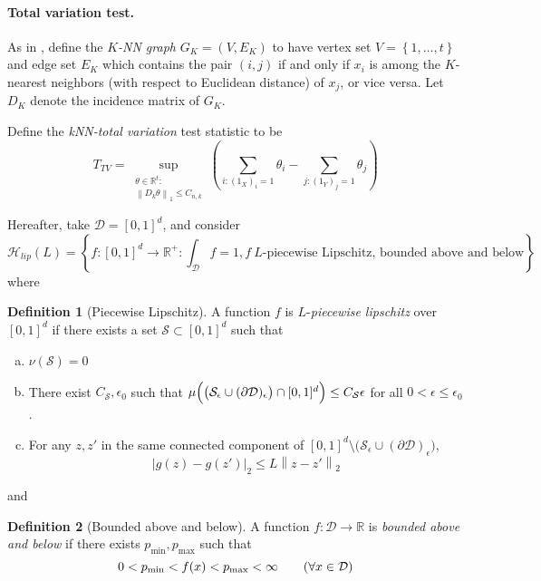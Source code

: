 \documentclass{article}
\newcommand{\Reals}{\mathbb{R}}
\newcommand{\norm}[1]{\left\lVert#1\right\rVert}
\newcommand{\abs}[1]{\left \lvert #1 \right \rvert}
\newcommand{\set}[1]{\left\{#1\right\}}
\newcommand{\1}{\mathbb{I}}
\newcommand{\D}{\mathcal{D}}
\newcommand{\Sset}{\mathcal{S}}
\newcommand{\Hclass}{\mathcal{H}}
\theoremstyle{alden}
\theoremstyle{aldenthm}
\theoremstyle{definition}
\newtheorem{definition}{Definition}[section]
\theoremstyle{remark}
\begin{document}
\paragraph{Total variation test.}

As in \citep{padilla2018}, define the \emph{$K$-NN graph} $G_K = (V,E_K)$ to have vertex set $V = \set{1, \ldots, t}$ and edge set $E_K$ which contains the pair $(i,j)$ if and only if $x_i$ is among the $K$-nearest neighbors (with respect to Euclidean distance) of $x_j$, or vice versa. Let $D_K$ denote the incidence matrix of $G_K$. 

Define the \emph{kNN-total variation} test statistic to be
\begin{equation}
\label{eqn: knn_tv_test_statistic}
T_{TV} = \sup_{\substack{\theta \in \Reals^{t}: \\ \norm{D_{k} \theta}_1 \leq C_{n,k}} } \left(\sum_{i: (1_X)_i = 1} \theta_i - \sum_{j:(1_Y)_j = 1} \theta_j\right)
\end{equation}

Hereafter, take $\D = [0,1]^d$, and consider
\begin{equation*}
\Hclass_{lip}(L) = \set{f: [0,1]^d \to \Reals^{+}: \int_{\D}f = 1, f~ \text{$L$-piecewise Lipschitz, bounded above and below} }
\end{equation*}
where
\begin{definition}[Piecewise Lipschitz]
	\label{def: piecewise_lipschitz}
	A function $f$ is $L$-\emph{piecewise lipschitz} over $[0,1]^d$ if there exists a set $\Sset \subset [0,1]^d$ such that
	\begin{enumerate}[(a)]
		\item $\nu(\Sset) = 0$
		\item There exist $C_{\Sset}, \epsilon_0$ such that $\mu \Bigl( \bigl(\Sset_{\epsilon} \cup (\partial \D)_{\epsilon} \bigr) \cap [0,1]^d \Bigr) \leq C_{\Sset} \epsilon$ for all $0 < \epsilon \leq \epsilon_0$.
		\item For any $z, z'$ in the same connected component of $[0,1]^d \setminus \bigl(\Sset_{\epsilon} \cup (\partial \D)_{\epsilon}\bigr)$,
		\begin{equation*}
		\abs{g(z) - g(z')}_2 \leq L\norm{z - z'}_2
		\end{equation*}
	\end{enumerate}
\end{definition}
and
\begin{definition}[Bounded above and below]
	\label{def: bounded}
	A function $f: \D \to \Reals$ is \emph{bounded above and below} if there exists $p_{\min}, p_{\max}$ such that
	\begin{equation*}
	0 < p_{\min} < f(x) < p_{\max} < \infty \tag{$\forall x \in \D$}
	\end{equation*}
\end{definition}
\end{document}
